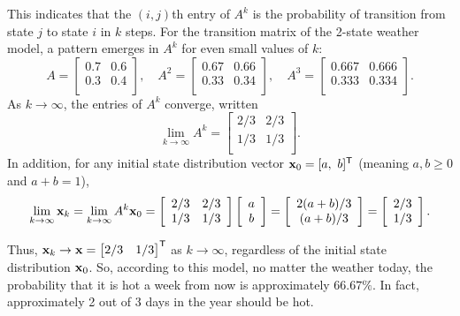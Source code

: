 This indicates that the $(i,j)$th entry of $A^k$ is the probability of transition from state $j$ to state $i$ in $k$ steps.
For the transition matrix of the 2-state weather model, a pattern emerges in $A^k$ for even small values of $k$:
\[
A = \left[\begin{array}{cc}
0.7 & 0.6 \\
0.3 & 0.4 \\
\end{array}\right],
\quad
A^2 = \left[\begin{array}{cc}
0.67 & 0.66 \\
0.33 & 0.34 \\
\end{array}\right],
\quad
A^3 = \left[\begin{array}{cc}
0.667 & 0.666 \\
0.333 & 0.334 \\
\end{array}\right].
\]
As $k\rightarrow\infty$, the entries of $A^k$ converge, written
\begin{equation}
\lim_{k \rightarrow \infty} A^k = \left[\begin{array}{ccc}
2/3 & 2/3 \\
1/3 & 1/3 \\
\end{array}\right].
\label{eq:markov-steady-transition}
\end{equation}
In addition, for any initial state distribution vector $\mathbf{x}_{0} = [a,\ b]^{\mathsf T}$ (meaning $a,b\ge 0$ and $a + b = 1$),
\[
\lim_{k \rightarrow \infty} \mathbf{x}_k = \lim_{k \rightarrow \infty}A^k\mathbf{x}_{0}
=
\left[\begin{array}{ccc}
2/3 & 2/3 \\
1/3 & 1/3 \\
\end{array}\right]
\left[\begin{array}{c}a\\b\end{array}\right]
=
\left[\begin{array}{c}2(a+b)/3\\(a+b)/3\end{array}\right]
=
\left[\begin{array}{c}2/3\\1/3\end{array}\right].
\]

Thus, $\mathbf{x}_k \rightarrow \mathbf{x} = \begin{bmatrix}2/3 & 1/3\end{bmatrix}^{\mathsf T}$ as $k\rightarrow\infty$,  regardless of the initial state distribution $\mathbf{x}_{0}$.
So, according to this model, no matter the weather today, the probability that it is hot a week from now is approximately $66.67\%$.
In fact, approximately 2 out of 3 days in the year should be hot.

